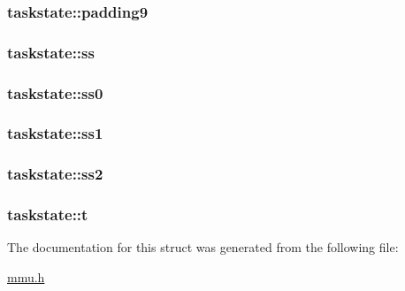 \subsubsection[{\texorpdfstring{padding9}{padding9}}]{ taskstate\+::padding9}\hypertarget{structtaskstate_a58a780ba0664e4ff8741adbdaccbcdd5}{}\label{structtaskstate_a58a780ba0664e4ff8741adbdaccbcdd5}
\subsubsection[{\texorpdfstring{ss}{ss}}]{ taskstate\+::ss}\hypertarget{structtaskstate_afdd8f3985ac7ae69fc67c19d65653f12}{}\label{structtaskstate_afdd8f3985ac7ae69fc67c19d65653f12}
\subsubsection[{\texorpdfstring{ss0}{ss0}}]{ taskstate\+::ss0}\hypertarget{structtaskstate_a574e97ea3fd87f314da88afec3c6f574}{}\label{structtaskstate_a574e97ea3fd87f314da88afec3c6f574}
\subsubsection[{\texorpdfstring{ss1}{ss1}}]{ taskstate\+::ss1}\hypertarget{structtaskstate_ac70c36414956cfee04c733a5b530d8ef}{}\label{structtaskstate_ac70c36414956cfee04c733a5b530d8ef}
\subsubsection[{\texorpdfstring{ss2}{ss2}}]{ taskstate\+::ss2}\hypertarget{structtaskstate_a573d8f57ef11630e782d8b7c924f28ce}{}\label{structtaskstate_a573d8f57ef11630e782d8b7c924f28ce}
\subsubsection[{\texorpdfstring{t}{t}}]{ taskstate\+::t}\hypertarget{structtaskstate_ad9d64e6139f851a3f8d2275f2748fae5}{}\label{structtaskstate_ad9d64e6139f851a3f8d2275f2748fae5}


The documentation for this struct was generated from the following file\+:\begin{DoxyCompactItemize}
\item 
\hyperlink{mmu_8h}{mmu.\+h}\end{DoxyCompactItemize}
